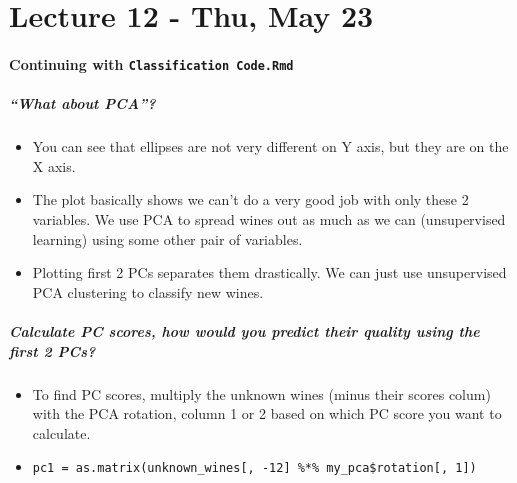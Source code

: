 \hypertarget{lecture-12---thu-may-23}{%
\chapter{Lecture 12 - Thu, May 23}\label{lecture-12---thu-may-23}}

\hypertarget{continuing-with-classification-code.rmd}{%
\subsubsection{\texorpdfstring{Continuing with
\texttt{Classification\ Code.Rmd}}{Continuing with Classification Code.Rmd}}\label{continuing-with-classification-code.rmd}}

\hypertarget{what-about-pca}{%
\paragraph{``What about PCA''?}\label{what-about-pca}}

\begin{itemize}
\tightlist
\item
  You can see that ellipses are not very different on Y axis, but they
  are on the X axis.
\item
  The plot basically shows we can't do a very good job with only these 2
  variables. We use PCA to spread wines out as much as we can
  (unsupervised learning) using some other pair of variables.
\item
  Plotting first 2 PCs separates them drastically. We can just use
  unsupervised PCA clustering to classify new wines.
\end{itemize}

\hypertarget{calculate-pc-scores-how-would-you-predict-their-quality-using-the-first-2-pcs}{%
\paragraph{Calculate PC scores, how would you predict their quality
using the first 2
PCs?}\label{calculate-pc-scores-how-would-you-predict-their-quality-using-the-first-2-pcs}}

\begin{itemize}
\tightlist
\item
  To find PC scores, multiply the unknown wines (minus their scores
  colum) with the PCA rotation, column 1 or 2 based on which PC score
  you want to calculate.
\item
  \texttt{pc1\ =\ as.matrix(unknown\_wines{[},\ -12{]}\ \%*\%\ my\_pca\$rotation{[},\ 1{]})}
\end{itemize}

